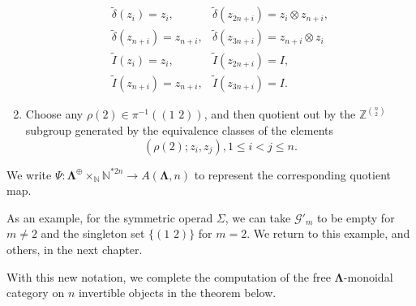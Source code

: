 \documentclass{amsbook} %
\newcommand{\ML}{\mathbf{\Lambda}}
\newcommand{\trans}[2]{( #1 \, \, #2 )}
\numberwithin{section}{chapter}
\begin{document}
\begin{Defi}
\begin{enumerate}
\[\begin{array}{ll}
  		\tilde{\delta}(z_i) = z_i, & \tilde{\delta}(z_{2n+i}) = z_i \otimes z_{n+i}, \\
  		\tilde{\delta}(z_{n+i}) = z_{n+i}, & \tilde{\delta}(z_{3n+i}) = z_{n+i} \otimes z_i \\
      \tilde{I}(z_i) = z_i, & \tilde{I}(z_{2n+i}) = I,\\
      \tilde{I}(z_{n+i}) = z_{n+i}, & \tilde{I}(z_{3n+i}) = I.
  	\end{array}
  \] 
\item Choose any $\rho(2) \in \pi^{-1}(\trans{1}{2})$, and then quotient out by the $\mathbb{Z}^{\binom{n}{2}}$ subgroup generated by the equivalence classes of the elements 
  \[
    \left(\rho(2) ;z_i, z_j \right), 1 \le i < j \le n.
  \]
\end{enumerate}
We write $\Psi \colon  \ML^{\oplus} \times_{\mathbb{N}} \mathbb{N}^{\ast 2n} \rightarrow A(\ML,n)$ to represent the corresponding quotient map. 
\end{Defi}

\begin{example}
As an example, for the symmetric operad $\Sigma$, we can take $\mathcal{G}'_m$ to be empty for $m \neq 2$ and the singleton set $\{ \trans{1}{2} \}$ for $m=2$. We return to this example, and others, in the next chapter.
\end{example}

With this new notation, we complete the computation of the free $\ML$-monoidal category on $n$ invertible objects in the theorem below.
\end{document}
